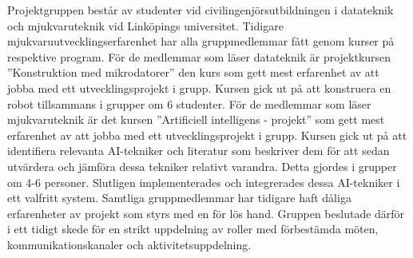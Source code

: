 Projektgruppen består av studenter vid civilingenjörsutbildningen i datateknik och mjukvaruteknik vid Linköpings universitet. Tidigare mjukvaruutvecklingserfarenhet har alla gruppmedlemmar fått genom kurser på respektive program. För de medlemmar som läser datateknik är projektkursen ”Konstruktion med mikrodatorer” den kurs som gett mest erfarenhet av att jobba med ett utvecklingsprojekt i grupp. Kursen gick ut på att konstruera en robot tillsammans i grupper om 6 studenter. För de medlemmar som läser mjukvaruteknik är det kursen ”Artificiell intelligens - projekt” som gett mest erfarenhet av att jobba med ett utvecklingsprojekt i grupp. Kursen gick ut på att identifiera relevanta AI-tekniker och literatur som beskriver dem för att sedan utvärdera och jämföra dessa tekniker relativt varandra. Detta gjordes i grupper om 4-6 personer. Slutligen implementerades och integrerades dessa AI-tekniker i ett valfritt system. Samtliga gruppmedlemmar har tidigare haft dåliga erfarenheter av projekt som styrs med en för lös hand. Gruppen beslutade därför i ett tidigt skede för en strikt uppdelning av roller med förbestämda möten, kommunikationskanaler och aktivitetsuppdelning.

